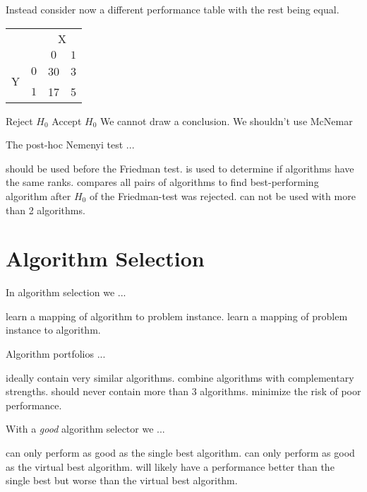 \documentclass{exam}
\begin{document}
\begin{questions}
\question Instead consider now a different performance table with the rest being equal.
    \begin{center}
      \begin{tabular}{cc|cc}
          & & \multicolumn{2}{c}{X} \\
          & & $0$ & $1$ \\
          \hline
          \multirow{2}{*}{Y} & $0$ & 30 & 3 \\
          & $1$ & 17 & 5 \\
      \end{tabular}
    \end{center}
\begin{choices}
    \choice Reject $H_0$
    \choice Accept $H_0$
    \choice We cannot draw a conclusion.
    \choice We shouldn't use McNemar %
\end{choices}

\question The post-hoc Nemenyi test ...
\begin{choices}
    \choice should be used before the Friedman test.
    \choice is used to determine if algorithms have the same ranks.
    \choice compares all pairs of algorithms to find best-performing algorithm after $H_0$ of the
Friedman-test was rejected. %
\choice can not be used with more than 2 algorithms.
\end{choices}

\pagebreak
\section{Algorithm Selection}

\question In algorithm selection we ...
\begin{choices}
    \choice learn a mapping of algorithm to problem instance.
    \choice learn a mapping of problem instance to algorithm. %
\end{choices}

\question Algorithm portfolios ...
\begin{choices}
    \choice ideally contain very similar algorithms.
    \choice combine algorithms with complementary strengths. %
    \choice should never contain more than $3$ algorithms.
    \choice minimize the risk of poor performance. %
\end{choices}

\question With a \textit{good} algorithm selector we ...
\begin{choices}
    \choice can only perform as good as the single best algorithm.
    \choice can only perform as good as the virtual best algorithm. %
    \choice will likely have a performance better than the single best but worse than the virtual best algorithm. %
\end{choices}


\end{questions}
\end{document}

